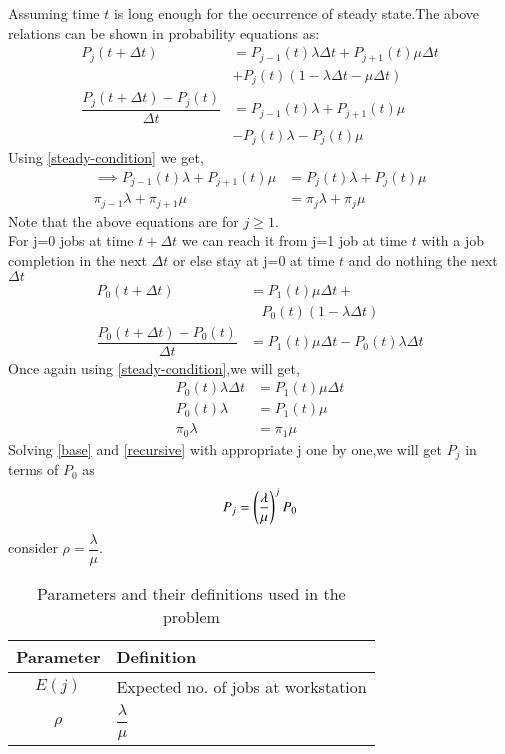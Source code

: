 \documentclass[journal,12pt,twocolumn]{IEEEtran}
\begin{document}
 Assuming time  $t$ is long enough for the occurrence of steady state.The above relations can be shown in probability equations as:  
 \begin{align}
     P_j(t+\Delta t)&=P_{j-1}(t)\lambda\Delta t+ P_{j+1}(t)\mu \Delta t \nonumber\\&+P_j (t) (1-\lambda\Delta t -\mu \Delta t)\\
     \dfrac{P_j(t+\Delta t)-P_j (t)}{\Delta t}&= P_{j-1}(t)\lambda +P_{j+1}(t)\mu\nonumber\\& - P_j(t)\lambda -P_j(t)\mu
\end{align}
Using \eqref{steady-condition} we get,
\begin{align}
     \implies P_{j-1}(t)\lambda +P_{j+1}(t)\mu&=P_j(t)\lambda +P_j(t)\mu \\
     \pi_{j-1}\lambda +\pi_{j+1}\mu&=\pi_j\lambda +\pi_j\mu\label{recursive} 
 \end{align}
 Note that the above equations are  for $j \geq 1$. \\
 For j=0 jobs at time $t+\Delta t$ we can reach it from j=1 job at time $t$ with a job completion in the next $\Delta t$ or else stay at j=0 at time $t$ and do nothing the next $\Delta t$
\begin{align}
    P_0(t+\Delta t)&=P_1(t)\mu \Delta t+\nonumber\\&~~~~P_0(t)(1-\lambda \Delta t)\\
    \dfrac{P_0(t+\Delta t)-P_0(t)}{\Delta t}&=P_1(t) \mu \Delta t-P_0(t)\lambda \Delta t
\end{align}
Once again using \eqref{steady-condition},we will get,
\begin{align}
    P_0(t)\lambda \Delta t&= P_1(t) \mu \Delta t\\
    P_0(t)\lambda&=P_1(t) \mu \\
    \pi_0 \lambda&=\pi_1\mu\label{base}
\end{align}
Solving \eqref{base} and \eqref{recursive} with appropriate j one by one,we will get $P_j$ in terms of $P_0$ as
\begin{equation}
    P_j=\left(\dfrac{\lambda}{\mu}\right)^jP_0 
\end{equation}
consider $\rho = \dfrac{\lambda}{\mu}$.
\begin{table}[h]
\begin{tabular}{|c|p{6cm}|}
\hline
\textbf{Parameter} & \textbf{Definition}                               \\ \hline
$E(j)$             & Expected no. of jobs at workstation \\ \hline
$\rho$             & $\dfrac{\lambda}{\mu}$\\\hline
\end{tabular}
\caption{Parameters and their definitions used in the problem}
\label{tab:parameters}
\end{table}
\end{document}
